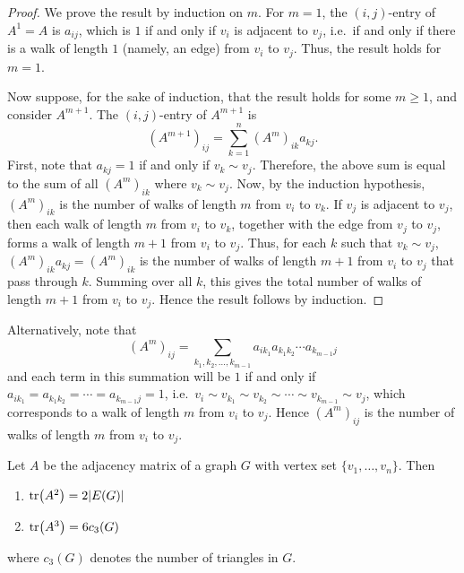 \begin{proof}
We prove the result by induction on $m$. For $m = 1$, the $(i,j)$-entry of $A^1 = A$ is $a_{ij}$, which is $1$ if and only if $v_i$ is adjacent to $v_j$, i.e.\ if and only if there is a walk of length $1$ (namely, an edge) from $v_i$ to $v_j$. Thus, the result holds for $m = 1$.

Now suppose, for the sake of induction, that the result holds for some $m \ge 1$, and consider $A^{m + 1}$. The $(i,j)$-entry of $A^{m + 1}$ is
\begin{equation*}
(A^{m + 1})_{ij} = \sum_{k = 1}^{n} (A^m)_{ik} a_{kj}.
\end{equation*}
First, note that $a_{kj} = 1$ if and only if $v_k \sim v_j$. Therefore, the above sum is equal to the sum of all $(A^m)_{ik}$ where $v_k \sim v_j$. Now, by the induction hypothesis, $(A^m)_{ik}$ is the number of walks of length $m$ from $v_i$ to $v_k$. If $v_j$ is adjacent to $v_j$, then each walk of length $m$ from $v_i$ to $v_k$, together with the edge from $v_j$ to $v_j$, forms a walk of length $m + 1$ from $v_i$ to $v_j$. Thus, for each $k$ such that $v_k \sim v_j$, $(A^m)_{ik} a_{kj} = (A^m)_{ik}$ is the number of walks of length $m + 1$ from $v_i$ to $v_j$ that pass through $k$. Summing over all $k$, this gives the total number of walks of length $m + 1$ from $v_i$ to $v_j$. Hence the result follows by induction.
\end{proof}

Alternatively, note that
\begin{equation*}
(A^m)_{ij} = \sum_{k_1, k_2, \ldots, k_{m-1}} a_{i k_1} a_{k_1 k_2} \cdots a_{k_{m-1} j}
\end{equation*}
and each term in this summation will be $1$ if and only if $a_{i k_1} = a_{k_1 k_2} = \cdots = a_{k_{m-1} j} = 1$, i.e.\ $v_i \sim v_{k_1} \sim v_{k_2} \sim \cdots \sim v_{k_{m-1}} \sim v_j$, which corresponds to a walk of length $m$ from $v_i$ to $v_j$. Hence $(A^m)_{ij}$ is the number of walks of length $m$ from $v_i$ to $v_j$.

\begin{Theorem}
Let $A$ be the adjacency matrix of a graph $G$ with vertex set $\{v_1, \ldots, v_n\}$. Then
\begin{enumerate}[label=(\roman*)]
\item $\tr(A^2) = 2 |E(G)|$
\item $\tr(A^3) = 6 c_3(G)$
\end{enumerate}
where $c_3(G)$ denotes the number of triangles in $G$.
\end{Theorem}

